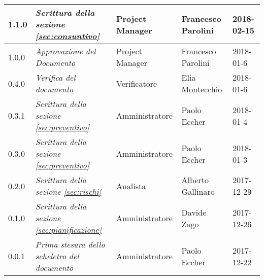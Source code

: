 \begin{longtable}[H]{C{2cm}|C{4cm}|C{3cm}|C{3cm}|R{2cm}}
		1.1.0 &\emph{Scrittura della sezione \ref{sec:consuntivo}} & Project Manager & Francesco Parolini & 2018-02-15 \\
		\hline
		
		1.0.0 &\emph{Approvazione del Documento} & Project Manager & Francesco Parolini & 2018-01-6 \\
		\hline
		
		0.4.0 &\emph{Verifica del documento} & Verificatore & Elia Montecchio & 2018-01-6 \\
		\hline
		
		0.3.1 &\emph{Scrittura della sezione \ref{sec:preventivo}} & Amministratore & Paolo Eccher  & 2018-01-4 \\
		\hline
		
		0.3.0 &\emph{Scrittura della sezione \ref{sec:preventivo}} & Amministratore & Paolo Eccher & 2018-01-3 \\
		\hline
		
		0.2.0 &\emph{Scrittura della sezione \ref{sec:rischi}} & Analista & Alberto Gallinaro & 2017-12-29 \\
		\hline
		
		0.1.0 &\emph{Scrittura della sezione \ref{sec:pianificazione}} & Amministratore & Davide Zago & 2017-12-26 \\
		\hline
		
		0.0.1 &\emph{Prima stesura dello scheletro del documento} & Amministratore & Paolo Eccher & 2017-12-22 \\
		
\end{longtable}
	

\clearpage